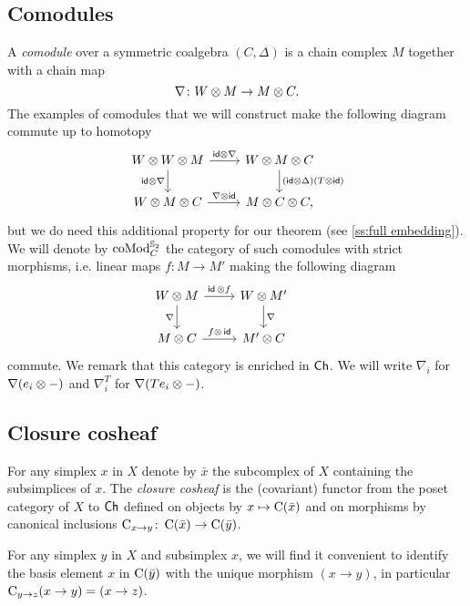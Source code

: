 \subsection{Comodules}

A \textit{comodule} over a symmetric coalgebra $(C, \Delta)$ is a chain complex $M$ together with a chain map
\[
\nabla \colon W \otimes M \to M \otimes C.
\]
The examples of comodules that we will construct make the following diagram commute up to homotopy
\[
\begin{tikzcd}
	W \ot W \ot M \arrow[r, "\id \ot \nabla"] \arrow[d, "\id \ot \nabla"'] &
	W \ot M \ot C \arrow[d, "(\id \ot \Delta)(T \ot \id)"] \\
	W \ot M \ot C \arrow[r, "\nabla \ot \id"] &
	M \ot C \ot C,
\end{tikzcd}
\]
but we do need this additional property for our theorem (see \cref{ss:full embedding}).
We will denote by $\operatorname{coMod}_C^{\mathbb{S}_2}$ the category of such comodules with strict morphisms, i.e. linear maps $f \colon M \to M'$ making the following diagram
\[
\begin{tikzcd}
	W \ot M \arrow[d, "\nabla"'] \arrow[r, "\id\, \ot f"] &
	W \ot M' \arrow[d, "\nabla"] & \\
	M \ot C \arrow[r, "f \ot\, \id"] &
	M' \ot C
\end{tikzcd}
\]
commute.
We remark that this category is enriched in $\mathsf{Ch}$.
We will write $\nabla_i$ for $\nabla(e_i \otimes -)$ and $\nabla_i^T$ for $\nabla(Te_i \otimes -)$.

\subsection{Closure cosheaf}

For any simplex $x$ in $X$ denote by $\bar x$ the subcomplex of $X$ containing the subsimplices of $x$.
The \textit{closure cosheaf} is the (covariant) functor from the poset category of $X$ to $\mathsf{Ch}$ defined on objects by $x \mapsto \operatorname{C}(\bar x)$ and on morphisms by canonical inclusions $\operatorname{C}_{x \to y} \colon \operatorname{C}(\bar x) \to \operatorname{C}(\bar y)$.

For any simplex $y$ in $X$ and subsimplex $x$, we will find it convenient to identify the basis element $x$ in $\operatorname{C}(\bar y)$ with the unique morphism $(x \to y)$, in particular $\operatorname{C}_{y \to z} (x \to y) = (x \to z)$.


